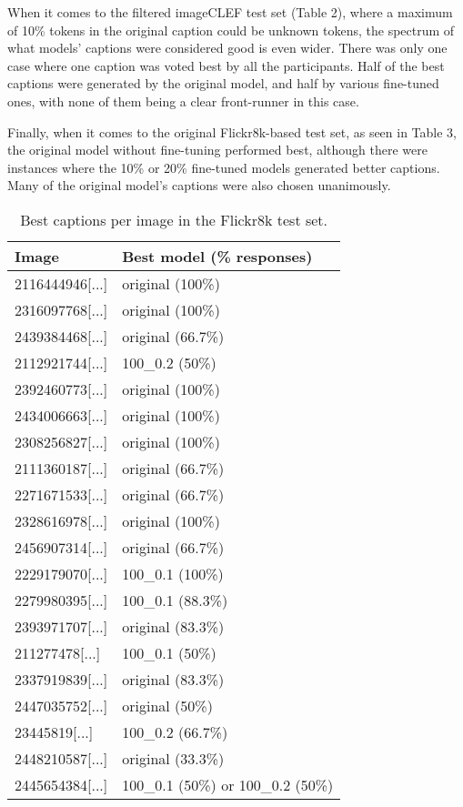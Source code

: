 \documentclass[11pt]{article}
\begin{document}
When it comes to the filtered imageCLEF test set (Table 2), where a maximum of 10\% tokens in the original caption could be unknown tokens, the spectrum of what models' captions were considered good is even wider. There was only one case where one caption was voted best by all the participants. Half of the best captions were generated by the original model, and half by various fine-tuned ones, with none of them being a clear front-runner in this case. 

Finally, when it comes to the original Flickr8k-based test set, as seen in Table 3, the original model without fine-tuning performed best, although there were instances where the 10\% or 20\% fine-tuned models generated better captions. Many of the original model's captions were also chosen unanimously. 

\begin{table}[h]
\begin{center}
\begin{tabular}{|p{2.5cm}|p{3cm}|}
\hline \bf Image & \bf Best model (\% responses) \\ \hline
2116444946[...] & original (100\%)  \\
2316097768[...] & original (100\%)  \\
2439384468[...] & original (66.7\%)  \\
2112921744[...] & 100\_0.2 (50\%)  \\
2392460773[...] & original (100\%) \\
2434006663[...] & original (100\%) \\
2308256827[...] & original (100\%) \\
2111360187[...] & original (66.7\%) \\
2271671533[...] & original (66.7\%)  \\
2328616978[...] & original (100\%)  \\
2456907314[...] & original (66.7\%)  \\
2229179070[...] & 100\_0.1 (100\%)  \\
2279980395[...] & 100\_0.1 (88.3\%)  \\
2393971707[...] & original (83.3\%)   \\
211277478[...] & 100\_0.1 (50\%) \\
2337919839[...] & original (83.3\%) \\
2447035752[...] & original (50\%) \\
23445819[...] & 100\_0.2 (66.7\%) \\
2448210587[...] & original (33.3\%) \\
2445654384[...] & 100\_0.1 (50\%) or 100\_0.2 (50\%)\\
\hline
\end{tabular}
\end{center}
\caption{\label{flickr-table} Best captions per image in the Flickr8k test set. }
\end{table}
\end{document}
